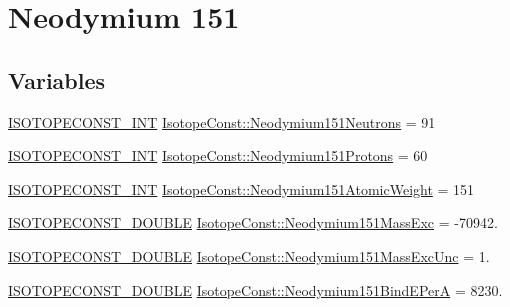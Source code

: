 \hypertarget{group___isotope_const-_neodymium-_nd151}{}\section{Neodymium 151}
\label{group___isotope_const-_neodymium-_nd151}
\subsection*{Variables}
\begin{DoxyCompactItemize}
\item 
\mbox{\hyperlink{group___isotope_const-_macros_ga5f18360b3e99483a35c32d789e62621c}{I\+S\+O\+T\+O\+P\+E\+C\+O\+N\+S\+T\+\_\+\+I\+NT}} \mbox{\hyperlink{group___isotope_const-_neodymium-_nd151_ga7de686713cfc7c0728ae1af4347cc160}{Isotope\+Const\+::\+Neodymium151\+Neutrons}} = 91
\item 
\mbox{\hyperlink{group___isotope_const-_macros_ga5f18360b3e99483a35c32d789e62621c}{I\+S\+O\+T\+O\+P\+E\+C\+O\+N\+S\+T\+\_\+\+I\+NT}} \mbox{\hyperlink{group___isotope_const-_neodymium-_nd151_gab06d073ba6c18b385762482f16c7c9b9}{Isotope\+Const\+::\+Neodymium151\+Protons}} = 60
\item 
\mbox{\hyperlink{group___isotope_const-_macros_ga5f18360b3e99483a35c32d789e62621c}{I\+S\+O\+T\+O\+P\+E\+C\+O\+N\+S\+T\+\_\+\+I\+NT}} \mbox{\hyperlink{group___isotope_const-_neodymium-_nd151_gacde86e732ffdbca1e3eebf949e80c091}{Isotope\+Const\+::\+Neodymium151\+Atomic\+Weight}} = 151
\item 
\mbox{\hyperlink{group___isotope_const-_macros_ga8f45a7272ce02c0b4c65c44636ed719a}{I\+S\+O\+T\+O\+P\+E\+C\+O\+N\+S\+T\+\_\+\+D\+O\+U\+B\+LE}} \mbox{\hyperlink{group___isotope_const-_neodymium-_nd151_gaa534675c3f96d9f74f1487b06fa54bfd}{Isotope\+Const\+::\+Neodymium151\+Mass\+Exc}} = -\/70942.
\item 
\mbox{\hyperlink{group___isotope_const-_macros_ga8f45a7272ce02c0b4c65c44636ed719a}{I\+S\+O\+T\+O\+P\+E\+C\+O\+N\+S\+T\+\_\+\+D\+O\+U\+B\+LE}} \mbox{\hyperlink{group___isotope_const-_neodymium-_nd151_gac0ad94b4927fdc5de726658edfedf532}{Isotope\+Const\+::\+Neodymium151\+Mass\+Exc\+Unc}} = 1.
\item 
\mbox{\hyperlink{group___isotope_const-_macros_ga8f45a7272ce02c0b4c65c44636ed719a}{I\+S\+O\+T\+O\+P\+E\+C\+O\+N\+S\+T\+\_\+\+D\+O\+U\+B\+LE}} \mbox{\hyperlink{group___isotope_const-_neodymium-_nd151_ga544d47094719ead1a8b3042d6da50109}{Isotope\+Const\+::\+Neodymium151\+Bind\+E\+PerA}} = 8230.
\item 

\end{DoxyCompactItemize}
